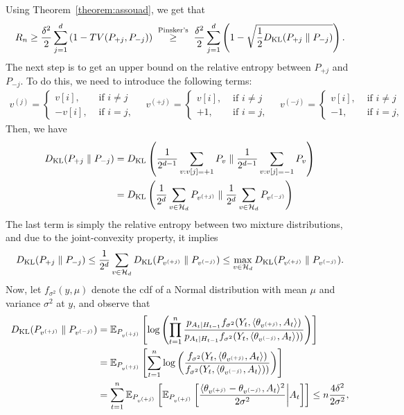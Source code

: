 \documentclass[12pt]{article}
\begin{document}
Using Theorem~\ref{theorem:assouad}, we get that 
\begin{align}
R_n \geq  \frac{\delta^2}{2} \sum_{j=1}^d \left( 1 - TV(P_{+j}, P_{-j}) \right) \;\stackrel{\text{Pinsker's}}{\geq}\; \frac{\delta^2}{2} \sum_{j=1}^d \left( 1 - \sqrt{\frac 1 2 D_{\text{KL}}(P_{+j} \parallel P_{-j})} \right).  \label{eq:assouad-application-1}
\end{align}
The next step is to get an upper bound on the relative entropy between $P_{+j}$ and $P_{-j}$. To do this, we need to introduce the following terms: 
\begin{align}
v^{(j)} = 
\begin{cases}
	v[i], & \text{ if } i \neq j \\
	-v[i], & \text{ if } i=j,
\end{cases}
\quad 
v^{(+j)} = 
\begin{cases}
	v[i], & \text{ if } i \neq j \\
	+1, & \text{ if } i=j,
\end{cases}
\quad 
v^{(-j)} = 
\begin{cases}
	v[i], & \text{ if } i \neq j \\
	-1, & \text{ if } i=j,
\end{cases}
\end{align}
Then, we have 
\begin{align}
D_{\text{KL}}(P_{+j} \parallel P_{-j}) &= D_{\text{KL}} \left( \frac{1}{2^{d-1}} \sum_{v:v[j]=+1} P_v \parallel \frac{1}{2^{d-1}} \sum_{v:v[j]=-1} P_v \right) \\
&= D_{\text{KL}} \left( \frac{1}{2^{d}} \sum_{v \in {\cal H}_d} P_{v^{(+j)}} \parallel \frac{1}{2^{d}} \sum_{v \in {\cal H}_d} P_{v^{(-j)}} \right)
\end{align}
The last term is simply the relative entropy between two mixture distributions, and due to the joint-convexity property, it implies 
\begin{align}
D_{\text{KL}}(P_{+j} \parallel P_{-j}) \leq \frac{1}{2^d} \sum_{v \in {\cal H}_d} D_{\text{KL}}(P_{v^{(+j)}} \parallel P_{v^{(-j)}}) \leq \max_{v \in {\cal H}_d} D_{\text{KL}}(P_{v^{(+j)}} \parallel P_{v^{(-j)}}). 
\end{align}
Now, let $f_{\sigma^2}(y, \mu)$ denote the cdf of a Normal distribution with mean $\mu$ and variance $\sigma^2$ at $y$, and observe that 
\begin{align}
D_{\text{KL}}(P_{v^{(+j)}} \parallel P_{v^{(-j)}}) &= \mathbb{E}_{P_{v^{(+j)}}}\left[ \log \left( \prod_{t=1}^n \frac{p_{A_t|H_{t-1}} f_{\sigma^2}(Y_t, \langle \theta_{v^{(+j)}}, A_t \rangle) }{p_{A_t|H_{t-1}} f_{\sigma^2}(Y_t, \langle \theta_{v^{(-j)}}, A_t \rangle )) } \right)\right]  \\
&= \mathbb{E}_{P_{v^{(+j)}}}\left[ \sum_{t=1}^n \log \left(  \frac{f_{\sigma^2}(Y_t, \langle \theta_{v^{(+j)}}, A_t \rangle) }{f_{\sigma^2}(Y_t, \langle \theta_{v^{(-j)}}, A_t \rangle )) } \right)\right]  \\
& = \sum_{t=1}^n \mathbb{E}_{P_{v^{(+j)}}} \left[ \mathbb{E}_{P_{v^{(+j)}}}\left[ \frac{\langle \theta_{v^{(+j)}} - \theta_{v^{(-j)}}, A_t \rangle^2}{2 \sigma^2} \middle\vert A_t \right] \right] \leq n \frac{4 \delta^2}{2 \sigma^2}, \label{eq:assouad-application-2}
\end{align}  
\end{document}
